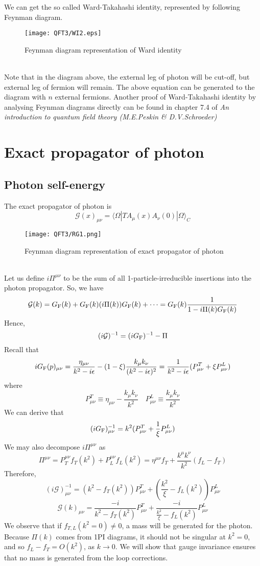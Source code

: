 We can get the so called Ward-Takahashi identity, represented by following Feynman diagram.
\begin{figure}[!h]
\centering
\texttt{[image: QFT3/WI2.eps]}
\caption{Feynman diagram representation of Ward identity}
\end{figure}
\\
Note that in the diagram above, the external leg of photon will be cut-off, but external leg of fermion will remain.
The above equation can be generated to the diagram with $n$ external fermions. 
Another proof of Ward-Takahashi identity by analysing Feynman diagrams directly can be found in chapter 7.4 of \emph{An introduction to quantum field theory (M.E.Peskin \& D.V.Schroeder)}

\section{Exact propagator of photon}
\subsection{Photon self-energy}
\noindent
The exact propagator of photon is
\[\mathcal{G}(x)_{\mu\nu} = \langle  \Omega | T A_{\mu}(x)A_{\nu}(0)| \Omega \rangle_C\]
\begin{figure}[!htb]
\centering
\texttt{[image: QFT3/RG1.png]}
\caption{Feynman diagram representation of exact propagator of photon}
\end{figure}
\\
Let us define $i\Pi^{\mu\nu}$ to be the sum of all 1-particle-irreducible insertions into the photon propagator.
So, we have
\[\mathcal{G}(k) = G_{\rm F}(k) + G_{\rm F}(k)(i\Pi(k))G_{\rm F}(k) + \cdots = G_{\rm F}(k) \frac{1}{1-i\Pi(k)G_{\rm F}(k)}\]
Hence,
\[(i\mathcal{G})^{-1} = (iG_{\rm F})^{-1} - \Pi\]
Recall that
\[iG_{\rm F}(p)_{\mu\nu}  = \frac{\eta_{\mu\nu}}{k^2-i\epsilon} - (1-\xi)\frac{k_{\mu}k_{\nu}}{(k^2-i\epsilon)^2} = \frac{1}{k^2-i\epsilon}(P^T_{\mu\nu} + \xi P^L_{\mu\nu})\]
where 
\[P^T_{\mu\nu} \equiv \eta_{\mu\nu} - \frac{k_{\mu}k_{\nu}}{k^2} \quad  P^L_{\mu\nu} \equiv \frac{k_{\mu}k_{\nu}}{k^2}\]
We can derive that
\[(iG_{\rm F})^{-1}_{\mu\nu} = k^2 (P^T_{\mu\nu} + \frac{1}{\xi} P^L_{\mu\nu})\]
We may also decompose $i\Pi^{\mu\nu}$ as
\[\Pi^{\mu\nu} = P_T^{\mu\nu}f_T(k^2) +  P_L^{\mu\nu}f_L(k^2) = \eta^{\mu\nu}f_T + \frac{k^{\mu}k^{\nu}}{k^2}(f_L-f_T)\]
Therefore,
\[(i\mathcal{G})^{-1}_{\mu\nu} = (k^2-f_T(k^2))P^T_{\mu\nu} + (\frac{k^2}{\xi}-f_L(k^2)) P^L_{\mu\nu}\]
\[\mathcal{G}(k)_{\mu\nu} = \frac{-i}{k^2-f_T(k^2)}P^T_{\mu\nu} + \frac{-i}{\frac{k^2}{\xi}-f_L(k^2)} P^L_{\mu\nu}\]
We observe that if $f_{T,L}(k^2 = 0) \neq 0$, a mass will be generated for the photon. Because $\Pi(k)$ comes from 1PI diagrams, it should not be singular at $k^2 =0 $, and so $f_L - f_T = O(k^2)$, as $k \to 0$. We will show that gauge invariance ensures that no mass is generated from the loop corrections.

